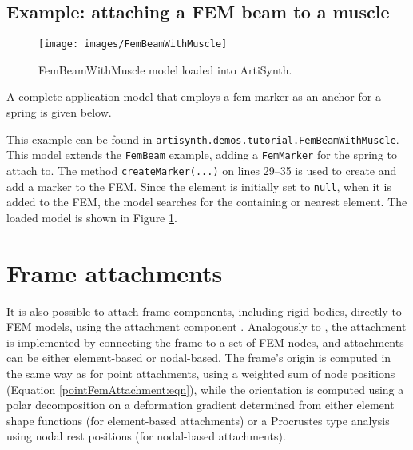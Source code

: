 \subsection{Example: attaching a FEM beam to a muscle}

\begin{figure}[ht]
	\centering
	\texttt{[image: images/FemBeamWithMuscle]}
	\caption{FemBeamWithMuscle model loaded into ArtiSynth.}
	\label{fig:fem:beamwithmuscle}
\end{figure}

A complete application model that employs a fem marker as an anchor for a spring
is given below.
\lstset{numbers=left}

\lstset{numbers=none}
This example can be found in {\tt artisynth.demos.tutorial.FemBeamWithMuscle}.
This model extends the {\tt FemBeam} example, adding a {\tt FemMarker} for the
spring to attach to.  The method {\tt createMarker(...)} on lines 29--35
is used to create and add a marker to the FEM.  Since the element is initially
set to {\tt null}, when it is added to the FEM, the model searches for the
containing or nearest element.  The loaded model is shown in Figure 
\ref{fig:fem:beamwithmuscle}.


\section{Frame attachments}
\label{sec:fem:frameattachments}

It is also possible to attach frame components, including rigid
bodies, directly to FEM models, using the attachment component
.
Analogously to
, the
attachment is implemented by connecting the frame to a set of FEM
nodes, and attachments can be either element-based or nodal-based.  The
frame's origin is computed in the same way as for point attachments,
using a weighted sum of node positions (Equation
\ref{pointFemAttachment:eqn}), while the orientation is computed using
a polar decomposition on a deformation gradient determined from either
element shape functions (for element-based attachments) or a
Procrustes type analysis using nodal rest positions (for nodal-based attachments).

